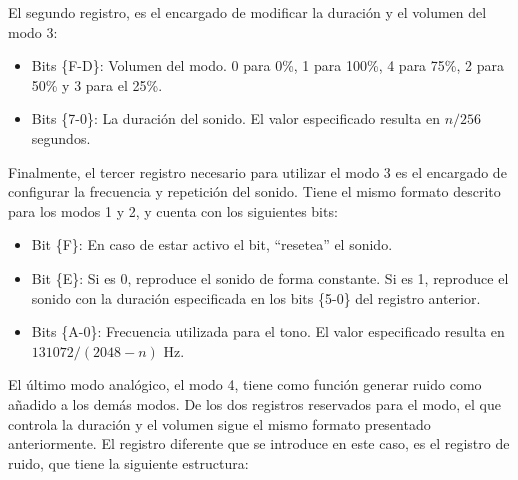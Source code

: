 El segundo registro, es el encargado de modificar la duración y el volumen del modo 3:

\begin{itemize}
	\item Bits \{F-D\}: Volumen del modo. 0 para 0\%, 1 para 100\%, 4 para 75\%, 2 para 50\% y 3 para el 25\%.
	\item Bits \{7-0\}: La duración del sonido. El valor especificado resulta en $n/256$ segundos.
\end{itemize}

Finalmente, el tercer registro necesario para utilizar el modo 3 es el encargado de configurar la frecuencia y repetición del sonido. Tiene el mismo formato descrito para los modos 1 y 2, y cuenta con los siguientes bits:

\begin{itemize}
	\item Bit \{F\}: En caso de estar activo el bit, ``resetea'' el sonido.
	\item Bit \{E\}: Si es 0, reproduce el sonido de forma constante. Si es 1, reproduce el sonido con la duración especificada en los bits \{5-0\} del registro anterior.
	\item Bits \{A-0\}: Frecuencia utilizada para el tono. El valor especificado resulta en $131072/(2048-n)$ Hz.
\end{itemize}

El último modo analógico, el modo 4, tiene como función generar ruido como añadido a los demás modos. De los dos registros reservados para el modo, el que controla la duración y el volumen sigue el mismo formato presentado anteriormente. El registro diferente que se introduce en este caso, es el registro de ruido, que tiene la siguiente estructura:

